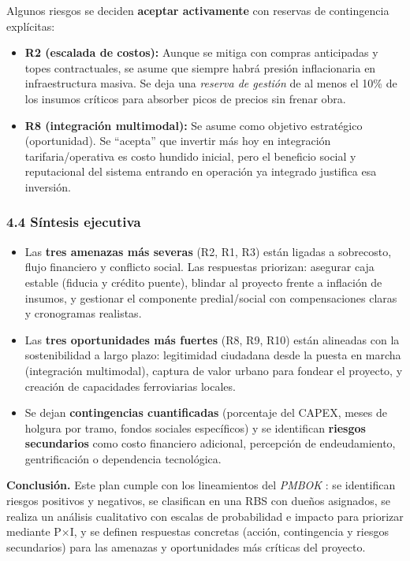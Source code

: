 Algunos riesgos se deciden \textbf{aceptar activamente} con reservas de contingencia explícitas:
\begin{itemize}
  \item \textbf{R2 (escalada de costos):} Aunque se mitiga con compras anticipadas y topes contractuales, se asume que siempre habrá presión inflacionaria en infraestructura masiva. Se deja una \emph{reserva de gestión} de al menos el 10\% de los insumos críticos para absorber picos de precios sin frenar obra.
  \item \textbf{R8 (integración multimodal):} Se asume como objetivo estratégico (oportunidad). Se “acepta” que invertir más hoy en integración tarifaria/operativa es costo hundido inicial, pero el beneficio social y reputacional del sistema entrando en operación ya integrado justifica esa inversión.
\end{itemize}

\subsubsection*{4.4 Síntesis ejecutiva}

\begin{itemize}
  \item Las \textbf{tres amenazas más severas} (R2, R1, R3) están ligadas a sobrecosto, flujo financiero y conflicto social. Las respuestas priorizan: asegurar caja estable (fiducia y crédito puente), blindar al proyecto frente a inflación de insumos, y gestionar el componente predial/social con compensaciones claras y cronogramas realistas.
  \item Las \textbf{tres oportunidades más fuertes} (R8, R9, R10) están alineadas con la sostenibilidad a largo plazo: legitimidad ciudadana desde la puesta en marcha (integración multimodal), captura de valor urbano para fondear el proyecto, y creación de capacidades ferroviarias locales.
  \item Se dejan \textbf{contingencias cuantificadas} (porcentaje del CAPEX, meses de holgura por tramo, fondos sociales específicos) y se identifican \textbf{riesgos secundarios} como costo financiero adicional, percepción de endeudamiento, gentrificación o dependencia tecnológica.
\end{itemize}

\textbf{Conclusión.}  
Este plan cumple con los lineamientos del \emph{PMBOK} \cite{PMBOK}: se identifican riesgos positivos y negativos, se clasifican en una RBS con dueños asignados, se realiza un análisis cualitativo con escalas de probabilidad e impacto para priorizar mediante P$\times$I, y se definen respuestas concretas (acción, contingencia y riesgos secundarios) para las amenazas y oportunidades más críticas del proyecto.
